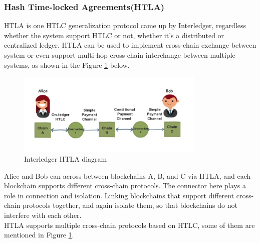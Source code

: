 \subsubsection{Hash Time-locked Agreements(HTLA)}
\noindent HTLA is one HTLC generalization protocol came up by Interledger\cite{HTLA}, regardless whether the system support HTLC or not, whether it's a distributed or centralized ledger. HTLA can be used to implement cross-chain exchange between system or even support multi-hop cross-chain interchange between multiple systems, as shown in the Figure \ref{fig:HTLA} below.
   \begin{figure}[H]
    \includegraphics[width=0.8\textwidth]{./figures/HTLA.png}
    \centering
    \caption{Interledger HTLA diagram}%
    \centering
    \label{fig:HTLA}
    \end{figure}
    
\noindent Alice and Bob can across between blockchains A, B, and C via HTLA, and each blockchain supports different cross-chain protocols. The connector here plays a role in connection and isolation. Linking blockchains that support different cross-chain protocols together, and again isolate them, so that blockchains do not interfere with each other.\\
\noindent HTLA supports multiple cross-chain protocols based on HTLC, some of them are mentioned in Figure \ref{fig:HTLA}.

